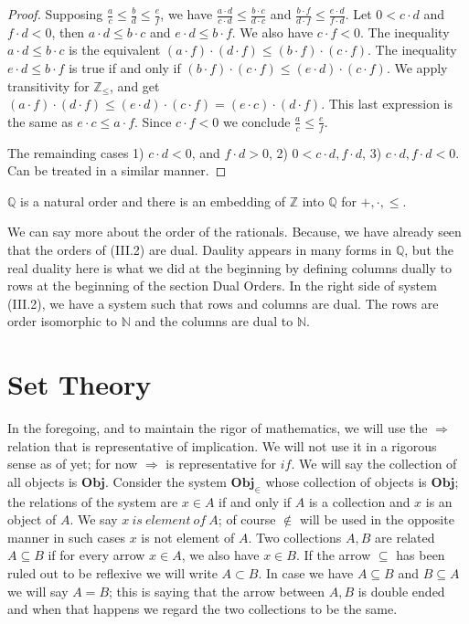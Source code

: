 \documentclass [12pt]{book}
\begin{document}
\begin{proof}Supposing $\frac ac\leq\frac bd\leq\frac ef$, we have $\frac{a\cdot d}{c\cdot d}\leq\frac{b\cdot c}{d\cdot c}$ and $\frac{b\cdot f}{d\cdot f}\leq\frac{e\cdot d}{f\cdot d}$. Let $0<c\cdot d$ and $f\cdot d<0$, then $a\cdot d\leq b\cdot c$ and $e\cdot d\leq b\cdot f$. We also have $c\cdot f<0$. The inequality $a\cdot d\leq b\cdot c$ is the equivalent $(a\cdot f)\cdot(d\cdot f)\leq(b\cdot f)\cdot(c\cdot f)$. The inequality $e\cdot d\leq b\cdot f$ is true if and only if $(b\cdot f)\cdot(c\cdot f)\leq(e\cdot d)\cdot (c\cdot f)$. We apply transitivity for $\mathbb Z_{\leq}$, and get $(a\cdot f)\cdot(d\cdot f)\leq(e\cdot d)\cdot (c\cdot f)=(e\cdot c)\cdot(d\cdot f)$. This last expression is the same as $e\cdot c\leq a\cdot f$. Since $c\cdot f<0$ we conclude $\frac ac\leq\frac ef$.

The remainding cases 1) $c\cdot d<0$, and $f\cdot d>0$, 2) $0<c\cdot d,f\cdot d$, 3) $c\cdot d,f\cdot d<0$. Can be treated in a similar manner.\end{proof}

\begin{theorem}$\mathbb Q$ is a natural order and there is an embedding of $\mathbb Z$ into $\mathbb Q$ for $+,\cdot,\leq$.\end{theorem}

We can say more about the order of the rationals. Because, we have already seen that the orders of (III.2) are dual. Daulity appears in many forms in $\mathbb Q$, but the real duality here is what we did at the beginning by defining columns dually to rows at the beginning of the section Dual Orders. In the right side of system (III.2), we have a system such that rows and columns are dual. The rows are order isomorphic to $\mathbb N$ and the columns are dual to $\mathbb N$.


\chapter{Set Theory}
In the foregoing, and to maintain the rigor of mathematics, we will use the $\Rightarrow$ relation that is representative of implication. We will not use it in a rigorous sense as of yet; for now $\Rightarrow$ is representative for $if$. We will say the collection of all objects is $\textbf{Obj}$. Consider the system $\textbf{Obj}_\in$ whose collection of objects is $\textbf{Obj}$; the relations of the system are $x\in A$ if and only if $A$ is a collection and $x$ is an object of $A$. We say $x~is~element~of~A$; of course $\notin$ will be used in the opposite manner in such cases $x$ is not element of $A$. Two collections $A,B$ are related $A\subseteq B$ if for every arrow $x\in A$, we also have $x\in B$. If the arrow $\subseteq$ has been ruled out to be reflexive we will write $A\subset B$. In case we have $A\subseteq B$ and $B\subseteq A$ we will say $A=B$; this is saying that the arrow between $A,B$ is double ended and when that happens we regard the two collections to be the same.
\end{document}
